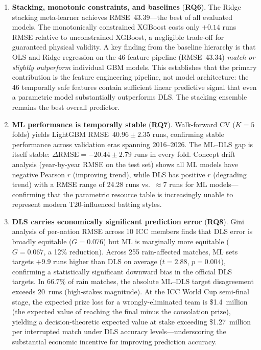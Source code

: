 \documentclass[12pt,a4paper,oneside]{report}
\begin{document}
\begin{enumerate}
    \item \textbf{Stacking, monotonic constraints, and baselines} (\textbf{RQ6}).  The Ridge stacking meta-learner achieves RMSE~43.39---the best of all evaluated models.  The monotonically constrained XGBoost costs only $+0.14$ runs RMSE relative to unconstrained XGBoost, a negligible trade-off for guaranteed physical validity.  A key finding from the baseline hierarchy is that OLS and Ridge regression on the 46-feature pipeline (RMSE~43.34) \emph{match or slightly outperform} individual GBM models.  This establishes that the primary contribution is the feature engineering pipeline, not model architecture: the 46 temporally safe features contain sufficient linear predictive signal that even a parametric model substantially outperforms DLS.  The stacking ensemble remains the best overall predictor.

    \item \textbf{ML performance is temporally stable} (\textbf{RQ7}).  Walk-forward CV ($K=5$ folds) yields LightGBM RMSE~$40.96 \pm 2.35$ runs, confirming stable performance across validation eras spanning 2016--2026.  The ML--DLS gap is itself stable: $\Delta\text{RMSE} = {-20.44 \pm 2.79}$ runs in every fold.  Concept drift analysis (year-by-year RMSE on the test set) shows all ML models have negative Pearson $r$ (improving trend), while DLS has positive $r$ (degrading trend) with a RMSE range of 24.28 runs vs.\ $\approx$7 runs for ML models---confirming that the parametric resource table is increasingly unable to represent modern T20-influenced batting styles.

    \item \textbf{DLS carries economically significant prediction error} (\textbf{RQ8}).  Gini analysis of per-nation RMSE across 10 ICC members finds that DLS error is broadly equitable ($G=0.076$) but ML is marginally more equitable ($G=0.067$, a 12\% reduction).  Across 255 rain-affected matches, ML sets targets $+9.9$ runs higher than DLS on average ($t=2.88$, $p=0.004$), confirming a statistically significant downward bias in the official DLS targets.  In 66.7\% of rain matches, the absolute ML--DLS target disagreement exceeds 20~runs (high-stakes magnitude).  At the ICC World Cup semi-final stage, the expected prize loss for a wrongly-eliminated team is \$1.4~million (the expected value of reaching the final minus the consolation prize), yielding a decision-theoretic expected value at stake exceeding \$1.27~million per interrupted match under DLS accuracy levels---underscoring the substantial economic incentive for improving prediction accuracy.
\end{enumerate}
\end{document}

